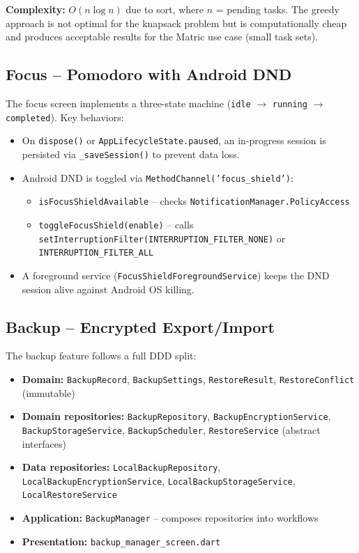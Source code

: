 \documentclass[12pt,a4paper,openany]{report}
\begin{document}
\textbf{Complexity:} $O(n \log n)$ due to sort, where $n$ = pending tasks. The greedy approach is not optimal for the knapsack problem but is computationally cheap and produces acceptable results for the Matric use case (small task sets).

\subsection{Focus -- Pomodoro with Android DND}

The focus screen implements a three-state machine (\texttt{idle} $\to$ \texttt{running} $\to$ \texttt{completed}). Key behaviors:

\begin{itemize}[leftmargin=*]
  \item On \texttt{dispose()} or \texttt{AppLifecycleState.paused}, an in-progress session is persisted via \texttt{\_saveSession()} to prevent data loss.
  \item Android DND is toggled via \texttt{MethodChannel('focus\_shield')}:
  \begin{itemize}[leftmargin=*]
    \item \texttt{isFocusShieldAvailable} -- checks \texttt{NotificationManager.PolicyAccess}
    \item \texttt{toggleFocusShield(enable)} -- calls \texttt{setInterruptionFilter(INTERRUPTION\_FILTER\_NONE)} or \texttt{INTERRUPTION\_FILTER\_ALL}
  \end{itemize}
  \item A foreground service (\texttt{FocusShieldForegroundService}) keeps the DND session alive against Android OS killing.
\end{itemize}

\subsection{Backup -- Encrypted Export/Import}

The backup feature follows a full DDD split:

\begin{itemize}[leftmargin=*]
  \item \textbf{Domain:} \texttt{BackupRecord}, \texttt{BackupSettings}, \texttt{RestoreResult}, \texttt{RestoreConflict} (immutable)
  \item \textbf{Domain repositories:} \texttt{BackupRepository}, \texttt{BackupEncryptionService}, \texttt{BackupStorageService}, \texttt{BackupScheduler}, \texttt{RestoreService} (abstract interfaces)
  \item \textbf{Data repositories:} \texttt{LocalBackupRepository}, \texttt{LocalBackupEncryptionService}, \texttt{LocalBackupStorageService}, \texttt{LocalRestoreService}
  \item \textbf{Application:} \texttt{BackupManager} -- composes repositories into workflows
  \item \textbf{Presentation:} \texttt{backup\_manager\_screen.dart}
\end{itemize}
\end{document}
